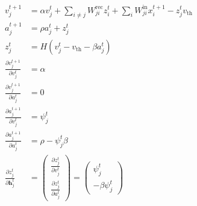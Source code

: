 \documentclass[t]{beamer}
\begin{document}
\begin{frame}
\begin{align}
v^{t+1}_j &= \alpha v_j^t + \sum_{i\neq j}W^\text{rec}_{ji}z_i^t + \sum_i W^\text{in}_{ji}x_i^{t+1} - z_j^tv_
            \text{th}\\
a^{t+1}_j &= \rho a^t_j + z^t_j\\
z^t_j &= H\left(v_j^t - v_\text{th} - \beta a^t_j\right)\\
\frac{\partial v_j^{t+1}}{\partial v_j^t} &= \alpha\\
\frac{\partial v_j^{t+1}}{\partial a_j^t} &= 0\\
\frac{\partial a_j^{t+1}}{\partial v_j^t} &= \psi^t_j\\
\frac{\partial a_j^{t+1}}{\partial a_j^t} &= \rho - \psi^t_j\beta\\
\frac{\partial z^t_j}{\partial\mathbf{h}^t_j} &= \begin{pmatrix}
                    \frac{\partial z^t_j}{\partial v^t_j}\\
                    \frac{\partial z^t_j}{\partial a^t_j}
                    \end{pmatrix}
                = \begin{pmatrix}
                    \psi^t_j\\
                    -\beta\psi^t_j
                    \end{pmatrix}
\end{align}
\end{frame}
\end{document}
